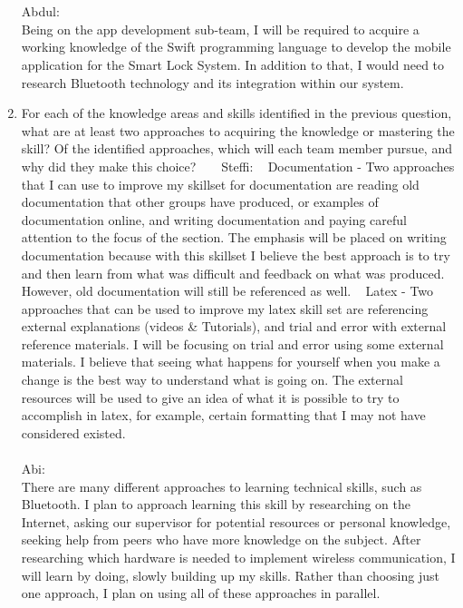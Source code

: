 \documentclass[12pt]{article}
\begin{document}
\begin{enumerate}
 \\
\\
Abdul:
\\ 
 Being on the app development sub-team, I will be required to acquire a working knowledge of the Swift programming language to develop the mobile application for the Smart Lock System.  In addition to that, I would need to research Bluetooth technology and its integration within our system.
 
 
  \item For each of the knowledge areas and skills identified in the previous
  question, what are at least two approaches to acquiring the knowledge or
  mastering the skill?  Of the identified approaches, which will each team
  member pursue, and why did they make this choice?
    ~\newline
    ~\newline
Steffi: 
  ~\newline
 Documentation - Two approaches that I can use to improve my skillset for documentation are reading old documentation that other groups have produced, or examples of documentation online, and writing documentation and paying careful attention to the focus of the section.  The emphasis will be placed on writing documentation because with this skillset I believe the best approach is to try and then learn from what was difficult and feedback on what was produced.  However, old documentation will still be referenced as well. 
  ~\newline
  Latex - Two approaches that can be used to improve my latex skill set are referencing external explanations (videos \& Tutorials), and trial and error with external reference materials.  I will be focusing on trial and error using some external materials.  I believe that seeing what happens for yourself when you make a change is the best way to understand what is going on.  The external resources will be used to give an idea of what it is possible to try to accomplish in latex, for example, certain formatting that I may not have considered existed. 
\\
\\
Abi:
\\ There are many different approaches to learning technical skills, such as Bluetooth.  I plan to approach learning this skill by researching on the Internet, asking our supervisor for potential resources or personal knowledge, seeking help from peers who have more knowledge on the subject.  After researching which hardware is needed to implement wireless communication, I will learn by doing, slowly building up my skills. Rather than choosing just one approach, I plan on using all of these approaches in parallel. 

\end{enumerate}
\end{document}
